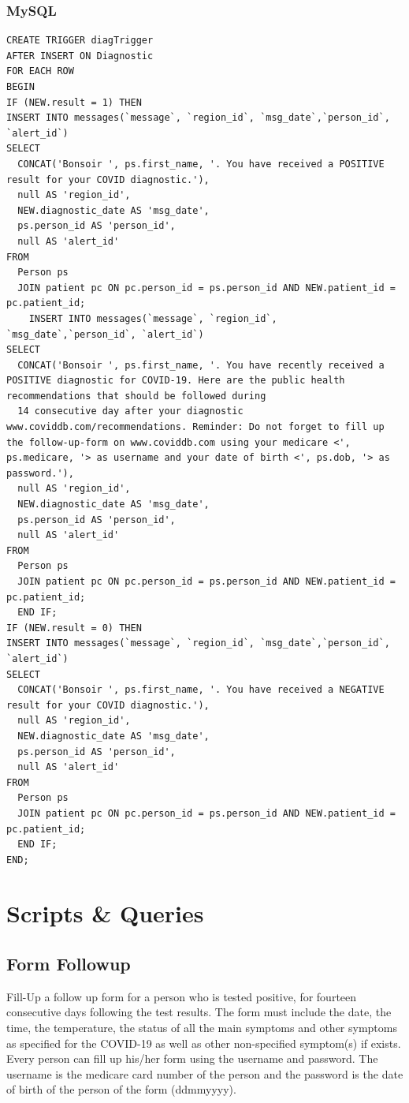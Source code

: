\documentclass{article}
\begin{document}
\subsubsection{MySQL}
\begin{verbatim}
CREATE TRIGGER diagTrigger
AFTER INSERT ON Diagnostic
FOR EACH ROW
BEGIN
IF (NEW.result = 1) THEN
INSERT INTO messages(`message`, `region_id`, `msg_date`,`person_id`, `alert_id`)
SELECT 
  CONCAT('Bonsoir ', ps.first_name, '. You have received a POSITIVE result for your COVID diagnostic.'),
  null AS 'region_id',
  NEW.diagnostic_date AS 'msg_date',
  ps.person_id AS 'person_id',
  null AS 'alert_id'
FROM 
  Person ps
  JOIN patient pc ON pc.person_id = ps.person_id AND NEW.patient_id = pc.patient_id;
    INSERT INTO messages(`message`, `region_id`, `msg_date`,`person_id`, `alert_id`)
SELECT 
  CONCAT('Bonsoir ', ps.first_name, '. You have recently received a POSITIVE diagnostic for COVID-19. Here are the public health recommendations that should be followed during 
  14 consecutive day after your diagnostic www.coviddb.com/recommendations. Reminder: Do not forget to fill up the follow-up-form on www.coviddb.com using your medicare <', ps.medicare, '> as username and your date of birth <', ps.dob, '> as password.'),
  null AS 'region_id',
  NEW.diagnostic_date AS 'msg_date',
  ps.person_id AS 'person_id',
  null AS 'alert_id'
FROM 
  Person ps
  JOIN patient pc ON pc.person_id = ps.person_id AND NEW.patient_id = pc.patient_id;
  END IF;
IF (NEW.result = 0) THEN
INSERT INTO messages(`message`, `region_id`, `msg_date`,`person_id`, `alert_id`)
SELECT 
  CONCAT('Bonsoir ', ps.first_name, '. You have received a NEGATIVE result for your COVID diagnostic.'),
  null AS 'region_id',
  NEW.diagnostic_date AS 'msg_date',
  ps.person_id AS 'person_id',
  null AS 'alert_id'
FROM 
  Person ps
  JOIN patient pc ON pc.person_id = ps.person_id AND NEW.patient_id = pc.patient_id;
  END IF;
END;
\end{verbatim}



\section{Scripts \& Queries}

\subsection{Form Followup}
Fill-Up a follow up form for a person who is tested positive, for fourteen consecutive days following the test results. The form must include the date, the time, the temperature, the status of all the main symptoms and other symptoms as specified for the COVID-19 as well as other non-specified symptom(s) if exists. Every person can fill up his/her form using the username and password. The username is the medicare card number of the person and the password is the date of birth of the person of the form (ddmmyyyy).
\end{document}
